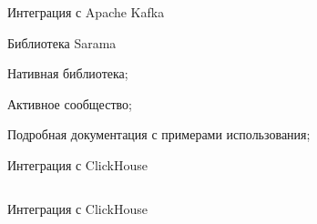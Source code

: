 \documentclass{beamer}
\begin{document}
\begin{frame}{Интеграция с Apache Kafka}
  \begin{alertblock}{Библиотека Sarama}
    \item Нативная библиотека;
    \item Активное сообщество;
    \item Подробная документация с примерами использования;
  \end{alertblock}
\end{frame}

\begin{frame}{Интеграция с ClickHouse}
  \begin{listing}[H]
		\caption{Структура для взаимодействия с ClickHouse}
		\inputminted[style=bw, frame=single,fontsize=\small, linenos=true, xleftmargin = 1.5em, breaklines=true]{golang}{./listings/click_repo.go}
	\end{listing}
\end{frame}

\begin{frame}{Интеграция с ClickHouse}
  \begin{listing}[H]
		\caption{Множественная вставка в ClickHouse}
		\inputminted[style=bw, frame=single,fontsize=\small, linenos=true, xleftmargin = 1.5em, breaklines=true]{golang}{./listings/bulk_insert_body.go}
	\end{listing}
\end{frame}
\end{document}
